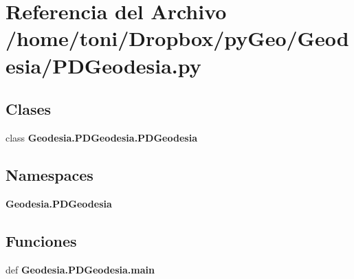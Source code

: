\section{Referencia del Archivo /home/toni/\-Dropbox/py\-Geo/\-Geodesia/\-P\-D\-Geodesia.py}
\label{Geodesia_2PDGeodesia_8py}
\subsection*{Clases}
\begin{DoxyCompactItemize}
\item 
class {\bf Geodesia.\-P\-D\-Geodesia.\-P\-D\-Geodesia}
\end{DoxyCompactItemize}
\subsection*{Namespaces}
\begin{DoxyCompactItemize}
\item 
{\bf Geodesia.\-P\-D\-Geodesia}
\end{DoxyCompactItemize}
\subsection*{Funciones}
\begin{DoxyCompactItemize}
\item 
def {\bf Geodesia.\-P\-D\-Geodesia.\-main}
\end{DoxyCompactItemize}
